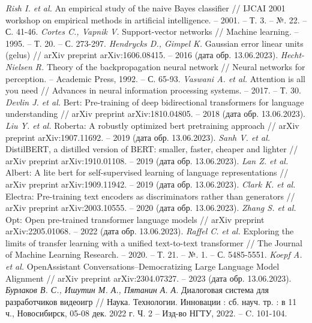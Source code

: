 \begin{thebibliography}{00}
     \textit{Rish I. et al.} An empirical study of the naive Bayes classifier // IJCAI 2001 workshop on empirical methods in artificial intelligence. – 2001. – Т. 3. – №. 22. – С. 41-46.
     \textit{Cortes C., Vapnik V.} Support-vector networks // Machine learning. – 1995. – Т. 20. – С. 273-297.
     \textit{Hendrycks D., Gimpel K.} Gaussian error linear units (gelus) // arXiv preprint arXiv:1606.08415. – 2016 (дата обр. 13.06.2023).
     \textit{Hecht-Nielsen R.} Theory of the backpropagation neural network // Neural networks for perception. – Academic Press, 1992. – С. 65-93.
     \textit{Vaswani A. et al.} Attention is all you need // Advances in neural information processing systems. – 2017. – Т. 30.
     \textit{Devlin J. et al.} Bert: Pre-training of deep bidirectional transformers for language understanding // arXiv preprint arXiv:1810.04805. – 2018 (дата обр. 13.06.2023).
     \textit{Liu Y. et al.} Roberta: A robustly optimized bert pretraining approach // arXiv preprint arXiv:1907.11692. – 2019 (дата обр. 13.06.2023).
     \textit{Sanh V. et al.} DistilBERT, a distilled version of BERT: smaller, faster, cheaper and lighter // arXiv preprint arXiv:1910.01108. – 2019 (дата обр. 13.06.2023).
     \textit{Lan Z. et al.} Albert: A lite bert for self-supervised learning of language representations // arXiv preprint arXiv:1909.11942. – 2019 (дата обр. 13.06.2023).
     \textit{Clark K. et al.} Electra: Pre-training text encoders as discriminators rather than generators // arXiv preprint arXiv:2003.10555. – 2020 (дата обр. 13.06.2023).
     \textit{Zhang S. et al.} Opt: Open pre-trained transformer language models // arXiv preprint arXiv:2205.01068. – 2022 (дата обр. 13.06.2023).
     \textit{Raffel C. et al.} Exploring the limits of transfer learning with a unified text-to-text transformer // The Journal of Machine Learning Research. – 2020. – Т. 21. – №. 1. – С. 5485-5551.
     \textit{Koepf A. et al.} OpenAssistant Conversations--Democratizing Large Language Model Alignment // arXiv preprint arXiv:2304.07327. – 2023 (дата обр. 13.06.2023).
     \textit{Бурлаков В. С., Ишутин М. А., Пятанин А. А.} Диалоговая система для разработчиков видеоигр // Наука. Технологии. Инновации : сб. науч. тр. : в 11 ч., Новосибирск, 05-08 дек. 2022 г. Ч. 2 -- Изд-во НГТУ, 2022. -- C. 101-104.

\end{thebibliography}
